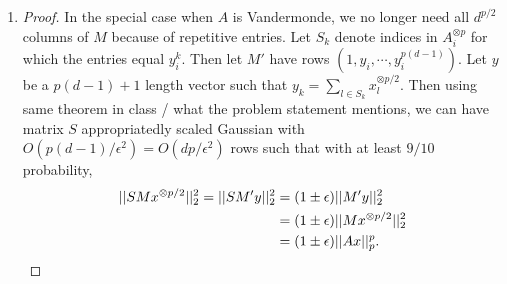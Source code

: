\documentclass[11pt]{article}
\begin{document}
\begin{enumerate}[1.]
\begin{proof}
\begin{align*}
    &= (1 \pm \epsilon)||Ax||_p^p.
\end{align*}
Finally, to compute $SM$ we need only to perform $O(d^{p/2}/\epsilon^2)d^{p/2}$ dot products of vectors of length $n$, which takes in total $n \cdot \text{poly}(d)$ time.
\end{proof}
\item \begin{proof}
In the special case when $A$ is Vandermonde, we no longer need all $d^{p/2}$ columns of $M$ because of repetitive entries. Let $S_k$ denote indices in $A_i^{\otimes p}$ for which the entries equal $y_i^k$. Then let $M'$ have rows $(1, y_i, \cdots, y_i^{p(d-1)})$. Let $y$ be a $p(d-1)+1$ length vector such that $y_k = \sum_{l \in S_k} x_l^{\otimes p/2}$. Then using same theorem in class / what the problem statement mentions, we can have matrix $S$ appropriatedly scaled Gaussian with $O(p(d-1)/\epsilon^2) = O(dp/\epsilon^2)$ rows such that with at least $9/10$ probability,
\begin{align*}
    ||SMx^{\otimes p/2}||_2^2 = ||SM'y||_2^2 &= (1 \pm \epsilon)||M'y||_2^2\\
    &= (1 \pm \epsilon)||Mx^{\otimes p/2}||_2^2\\
    &= (1 \pm \epsilon)||Ax||_p^p. \qedhere
\end{align*}
\end{proof}
\end{enumerate}
\end{document}

